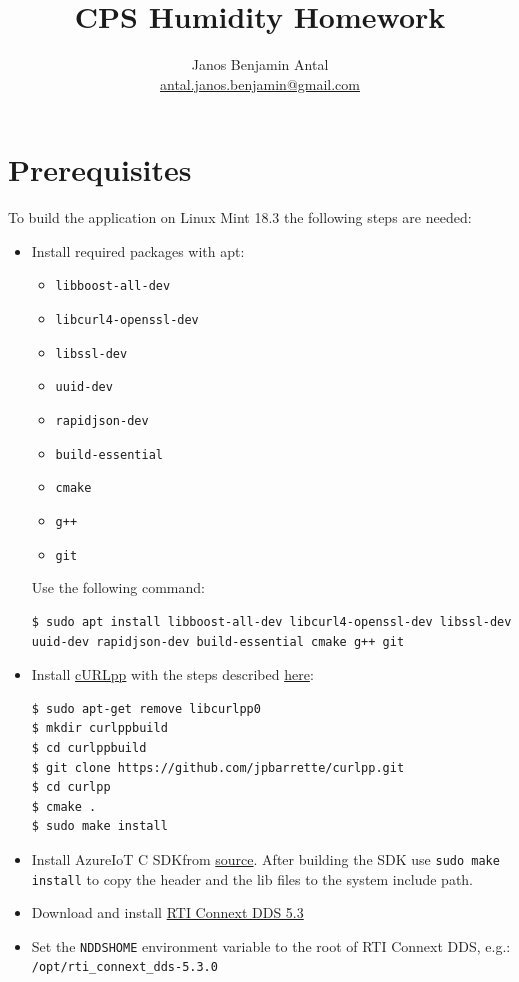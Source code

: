 \documentclass{article}
\author{Janos Benjamin Antal\\\href{mailto:antal.janos.benjamin@gmail.com}{antal.janos.benjamin@gmail.com}}
\title{CPS Humidity Homework}
\begin{document}
\maketitle
\section{Prerequisites}

To build the application on Linux Mint 18.3 the following steps are needed:

\begin{itemize}
\item Install required packages with apt: 
\begin{itemize}
\item \verb+libboost-all-dev+
\item \verb+libcurl4-openssl-dev+
\item \verb+libssl-dev+ %
\item \verb+uuid-dev+
\item \verb+rapidjson-dev+
\item \verb+build-essential+
\item \verb+cmake+
\item \verb!g++!
\item \verb+git+
\end{itemize}
Use the following command:
\begin{lstlisting}
$ sudo apt install libboost-all-dev libcurl4-openssl-dev libssl-dev uuid-dev rapidjson-dev build-essential cmake g++ git
\end{lstlisting}
\item Install \href{http://www.curlpp.org/}{cURLpp} with the steps described \href{https://github.com/beniz/deepdetect/issues/126}{here}:
\begin{verbatim}
$ sudo apt-get remove libcurlpp0
$ mkdir curlppbuild
$ cd curlppbuild
$ git clone https://github.com/jpbarrette/curlpp.git
$ cd curlpp
$ cmake .
$ sudo make install
\end{verbatim} 
\item Install AzureIoT C SDKfrom \href{https://github.com/Azure/azure-iot-sdk-c/blob/master/doc/devbox_setup.md}{source}. After building the SDK use \verb+sudo make install+ to copy the header and the lib files to the system include path.
\item Download and install \href{https://www.rti.com/gettingstarted/installlinux_secure}{RTI Connext DDS 5.3}
\item Set the \verb+NDDSHOME+ environment variable to the root of RTI Connext DDS, e.g.: \verb+/opt/rti_connext_dds-5.3.0+
\end{itemize}
\end{document}
